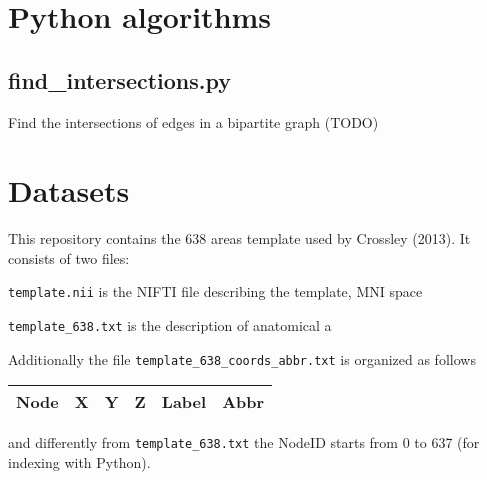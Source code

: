 \section{Python algorithms}\label{python-algorithms}

\begin{itemize}[<+->]
\tightlist

  \subsection*{find\_intersections.py} Find the intersections of edges in a
  bipartite graph (TODO)
\end{itemize}

\section{Datasets}\label{datasets}

This repository contains the 638 areas template used by Crossley (2013).
It consists of two files:

\begin{enumerate}[<+->]
\def\labelenumi{\arabic{enumi}.}
\tightlist

  \texttt{template.nii} is the NIFTI file describing the template, MNI
  space

  \texttt{template\_638.txt} is the description of anatomical a
\end{enumerate}

Additionally the file \texttt{template\_638\_coords\_abbr.txt} is
organized as follows

\begin{longtable}[]{@{}llllll@{}}
\toprule
Node & X & Y & Z & Label & Abbr\tabularnewline
\midrule
\endhead
\bottomrule
\end{longtable}

and differently from \texttt{template\_638.txt} the NodeID starts from 0
to 637 (for indexing with Python).
